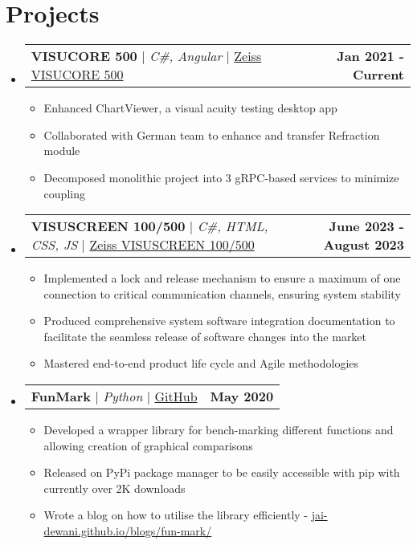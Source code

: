 \documentclass[letterpaper,11pt]{article}
\makeatletter
\newcommand{\resumeItem}[1]{
  \item\small{
    {#1 \vspace{-2pt}}
  }
}
\newcommand{\resumeProjectHeading}[2]{
    \item
    \begin{tabular*}{1.001\textwidth}{l@{\extracolsep{\fill}}r}
      \small#1 & \textbf{\small #2} \\
    \end{tabular*}\vspace{-7pt}
}
\newcommand{\resumeSubHeadingListStart}{\begin{itemize}[leftmargin=0.0in, label={}]}
\newcommand{\resumeSubHeadingListEnd}{\end{itemize}}
\newcommand{\resumeItemListStart}{\justify \begin{itemize} \vspace{-4pt}}
\newcommand{\resumeItemListEnd}{\end{itemize}\vspace{-1pt}}
\makeatother
\begin{document}
\section{Projects}
    \vspace{-2pt}
    \resumeSubHeadingListStart
        \resumeProjectHeading
            {\textbf{VISUCORE 500} $|$ \emph{C\#, Angular}  $|$ \href{https://www.zeiss.com/vision-care/int/eye-care-professionals/equipment/refraction/combined-refraction-unit.html}{Zeiss VISUCORE 500}}{Jan 2021 - Current}
            \resumeItemListStart
                \resumeItem{Enhanced ChartViewer, a visual acuity testing desktop app}
                \resumeItem{Collaborated with German team to enhance and transfer Refraction module}
                \resumeItem{Decomposed monolithic project into 3 gRPC-based services to minimize coupling}
            \resumeItemListEnd
        \resumeProjectHeading
            {\textbf{VISUSCREEN 100/500} $|$ \emph{C\#, HTML, CSS, JS}  $|$ \href{https://www.zeiss.com/vision-care/int/eye-care-professionals/equipment/refraction/subjective-refraction-unit.html}{Zeiss VISUSCREEN 100/500}}{June 2023 - August 2023}
            \resumeItemListStart
                \resumeItem{Implemented a lock and release mechanism to ensure a maximum of one connection to critical communication channels, ensuring system stability}
                \resumeItem{Produced comprehensive system software integration documentation to facilitate the seamless release of software changes into the market}
                \resumeItem{Mastered end-to-end product life cycle and Agile methodologies}
            \resumeItemListEnd
        \resumeProjectHeading
            {\textbf{FunMark} $|$ \emph{Python} $|$ \href{https://github.com/jai-dewani/fun-mark}{GitHub}}{May 2020} 
            \resumeItemListStart
                \resumeItem{Developed a wrapper library for bench-marking different functions and allowing creation of graphical comparisons}
                \resumeItem{Released on PyPi package manager to be easily accessible with pip with currently over 2K downloads}
                \resumeItem{Wrote a blog on how to utilise the library efficiently -  \href{https://jai-dewani.github.io/blogs/fun-mark/}{jai-dewani.github.io/blogs/fun-mark/}}
            \resumeItemListEnd 
    \resumeSubHeadingListEnd


%
\end{document}
